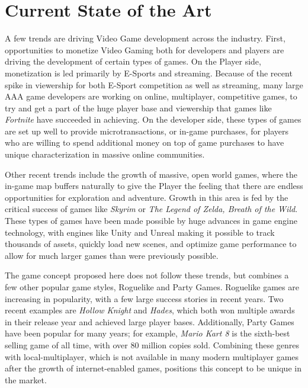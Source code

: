 \section{Current State of the Art}

A few trends are driving Video Game development across the industry. First, opportunities to monetize Video Gaming both for developers and
players are driving the development of certain types of games. On the Player side, monetization is led primarily by E-Sports and streaming. Because
of the recent spike in viewership for both E-Sport competition as well as streaming, many large AAA game developers are working on online,
multiplayer, competitive games, to try and get a part of the huge player base and viewership that games like \textit{Fortnite} have succeeded in
achieving. On the developer side, these types of games are set up well to provide microtransactions, or in-game purchases, for players who
are willing to spend additional money on top of game purchases to have unique characterization in massive online communities.

Other recent trends include the growth of massive, open world games, where the in-game map buffers naturally to give the Player the feeling that
there are endless opportunities for exploration and adventure. Growth in this area is fed by the critical success of games like \textit{Skyrim} or \textit{The
Legend of Zelda, Breath of the Wild}. These types of games have been made possible by huge advances in game engine technology, with engines like
Unity and Unreal making it possible to track thousands of assets, quickly load new scenes, and optimize game performance to allow for much
larger games than were previously possible.

The game concept proposed here does not follow these trends, but combines a few other popular game styles, Roguelike and Party Games. Roguelike
games are increasing in popularity, with a few large success stories in recent years. Two recent examples are \textit{Hollow Knight} and
\textit{Hades}, which both won multiple awards in their release year and achieved large player bases. Additionally, Party Games have been popular
for many years; for example, \textit{Mario Kart 8} is the sixth-best selling game of all time, with over 80 million copies sold. Combining these
genres with local-multiplayer, which is not available in many modern multiplayer games after the growth of internet-enabled games, positions this
concept to be unique in the market.
